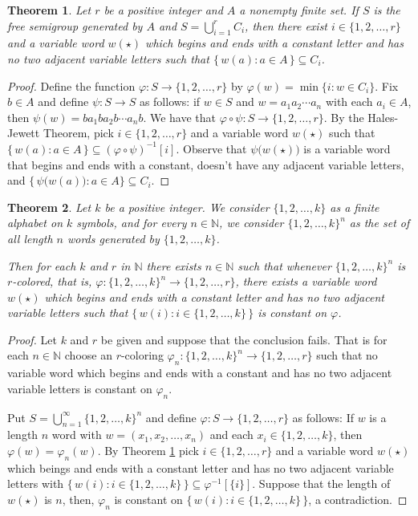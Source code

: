 \documentclass[12pt,showtrims]{memoir}
\theoremstyle{plain}
\newtheorem{thm}{Theorem}[section]
\theoremstyle{definition}
\newcommand{\bbN}{\mathbb{N}}
\begin{document}
\begin{thm}
  \label{thm:special-hj}
  Let $r$ be a positive integer and $A$ a nonempty finite set.
  If $S$ is the free semigroup generated by $A$ and $S = \bigcup_{i=1}^r C_i$, then there exist $i \in \{1, 2, \ldots, r\}$ and a variable word $w(\star)$ which begins and ends with a constant letter and has no two adjacent variable letters such that $\bigl\{\, w(a) : a \in A \,\bigr\} \subseteq C_i$.
\end{thm}
\begin{proof}
  Define the function $\varphi \colon S \to \{1, 2, \ldots, r\}$ by $\varphi(w) = \min\{i : w \in C_i\}$. 
  Fix $b \in A$ and define $\psi \colon S \to S$ as follows: if $w \in S$ and $w = a_1a_2 \cdots a_n$ with each $a_i \in A$, then $\psi(w) = ba_1ba_2b\cdots a_nb$.
  We have that $\varphi \circ \psi \colon S \to \{1, 2, \ldots, r\}$.
  By the Hales-Jewett Theorem, pick $i \in \{1, 2, \ldots, r\}$ and a variable word $w(\star)$ such that $\{\, w(a) : a \in A \,\} \subseteq (\varphi \circ \psi)^{-1}[i]$.
  Observe that $\psi\bigl(w(\star)\bigr)$ is a variable word that begins and ends with a constant, doesn't have any adjacent variable letters, and $\{\, \psi\bigl(w(a)\bigr) : a \in A \} \subseteq C_i$.
\end{proof}

\begin{thm}
  \label{thm:finitary-shj}
  Let $k$ be a positive integer.
  We consider $\{1, 2, \ldots, k\}$ as a finite alphabet on $k$ symbols, and for every $n \in \bbN$, we consider $\{1, 2, \ldots, k\}^n$ as the set of all length $n$ words generated by $\{1, 2, \ldots, k\}$.

  Then for each $k$ and $r$ in $\bbN$ there exists $n \in \bbN$ such that whenever $\{1, 2, \ldots, k\}^n$ is $r$-colored, that is, $\varphi \colon \{1, 2, \ldots, k\}^n \to \{1, 2, \ldots, r\}$, there exists a variable word $w(\star)$ which begins and ends with a constant letter and has no two adjacent variable letters such that $\bigl\{\, w(i) : i \in \{1, 2, \ldots, k\} \,\bigr\}$ is constant on $\varphi$.
\end{thm}
\begin{proof}
  Let $k$ and $r$ be given and suppose that the conclusion fails.
  That is for each $n \in \bbN$ choose an $r$-coloring $\varphi_n \colon \{1, 2, \ldots, k\}^n \to \{1, 2, \ldots, r\}$ such that no variable word which begins and ends with a constant and has no two adjacent variable letters is constant on $\varphi_n$.
  
  Put $S = \bigcup_{n=1}^\infty \{1, 2, \ldots, k\}^n$ and define $\varphi \colon S \to \{1, 2, \ldots, r\}$ as follows: If $w$ is a length $n$ word with $w = (x_1, x_2, \ldots, x_n)$ and each $x_i \in \{1, 2, \ldots, k\}$, then $\varphi(w) = \varphi_n(w)$.
  By Theorem \ref{thm:special-hj} pick $i \in \{1, 2, \ldots, r\}$ and a variable word $w(\star)$ which beings and ends with a constant letter and has no two adjacent variable letters with $\bigl\{\, w(i) : i \in \{1, 2, \ldots, k\} \,\bigr\} \subseteq \varphi^{-1}[\{i\}]$.
  Suppose that the length of $w(\star)$ is $n$, then, $\varphi_n$ is constant on $\bigl\{\, w(i) : i \in \{1, 2, \ldots, k\} \,\bigr\}$, a contradiction. 
\end{proof}
\end{document}

